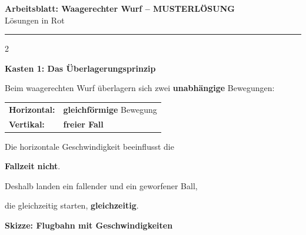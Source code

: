 \documentclass[10pt, a4paper]{article}
\newcommand{\fachfarbe}{physik}
\newcommand{\thema}{Waagerechter Wurf}
\newcommand{\lsg}[1]{\textcolor{loesung}{\textbf{#1}}}
\newcommand{\ph}[1]{\textcolor{\fachfarbe}{\textbf{#1}}}
\newcommand{\abschnitt}[1]{%
    \vspace{8pt}
    \noindent\textbf{\textcolor{\fachfarbe}{#1}}
    \vspace{4pt}
}
\begin{document}

\begin{center}
{\large\bfseries Arbeitsblatt: \thema{} -- \textcolor{loesung}{MUSTERLÖSUNG}}\\[2pt]
{\small\textcolor{grau}{Lösungen in Rot}}
\end{center}

\vspace{-2pt}
\hrule
\vspace{8pt}


\begin{multicols}{2}
\small


\abschnitt{Kasten 1: Das Überlagerungsprinzip}

\begin{merksatz}[Merksatz]
Beim waagerechten Wurf überlagern sich zwei \ph{unabhängige} Bewegungen:

\vspace{6pt}
\begin{tabular}{ll}
\textbf{Horizontal:} & \lsg{gleichförmige} Bewegung \\[4pt]
\textbf{Vertikal:} & \lsg{freier Fall} \\
\end{tabular}

\vspace{8pt}
Die horizontale Geschwindigkeit beeinflusst die

\lsg{Fallzeit} \textbf{nicht}.

\vspace{6pt}
Deshalb landen ein fallender und ein geworfener Ball,

die gleichzeitig starten, \lsg{gleichzeitig}.
\end{merksatz}

\vspace{4pt}


\abschnitt{Skizze: Flugbahn mit Geschwindigkeiten}


\end{multicols}
\end{document}
